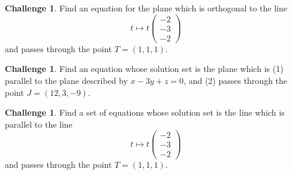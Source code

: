 \documentclass{tufte-book}
\theoremstyle{definition}
\newtheorem{challenge}[task]{Challenge}
\begin{document}
\begin{challenge}
Find an equation for the plane which is orthogonal to the line 
\[
t\mapsto t \begin{pmatrix} -2\\-3\\-2\end{pmatrix}
\]
and passes through the point $T = (1,1,1)$.
\end{challenge}

\begin{challenge}
Find an equation whose solution set is the plane which is (1) parallel to the plane described by $x-3y+z=0$, and (2) passes through the point $J = (12,3,-9)$.
\end{challenge}

\begin{challenge}
Find a set of equations whose solution set is the line which is parallel to the line 
\[
t\mapsto t \begin{pmatrix} -2\\-3\\-2\end{pmatrix}
\]
and passes through the point $T = (1,1,1)$.
\end{challenge}



%
%
\end{document}
